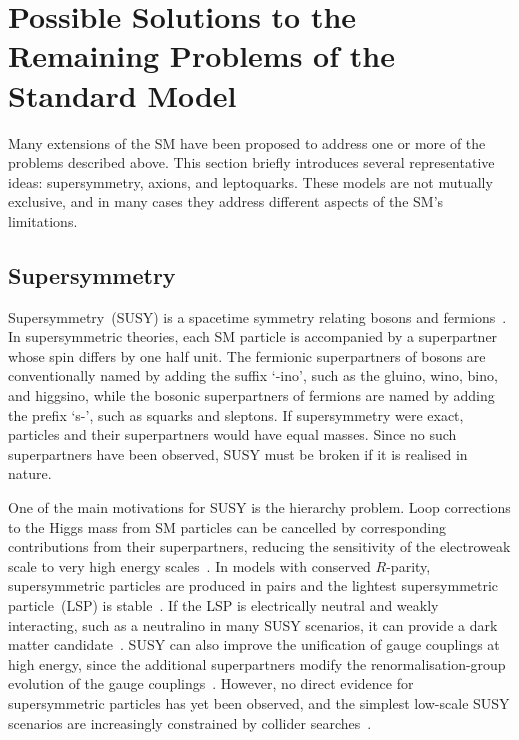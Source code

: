 \section{Possible Solutions to the Remaining Problems of the Standard Model}
\label{sec:bsm_solutions}

Many extensions of the SM have been proposed to address one or more of the problems described above. 
This section briefly introduces several representative ideas: supersymmetry, axions, and leptoquarks. 
These models are not mutually exclusive, and in many cases they address different aspects of the SM's limitations.

\subsection{Supersymmetry}
\label{subsec:susy}

Supersymmetry~(SUSY) is a spacetime symmetry relating bosons and fermions~\cite{WessZumino1974,MartinSUSYPrimer}.
In supersymmetric theories, each SM particle is accompanied by a superpartner whose spin differs by one half unit.
The fermionic superpartners of bosons are conventionally named by adding the suffix `-ino', such as the gluino, wino, bino, and higgsino, while the bosonic superpartners of fermions are named by adding the prefix `s-', such as squarks and sleptons.
If supersymmetry were exact, particles and their superpartners would have equal masses.
Since no such superpartners have been observed, SUSY must be broken if it is realised in nature.

One of the main motivations for SUSY is the hierarchy problem.
Loop corrections to the Higgs mass from SM particles can be cancelled by corresponding contributions from their superpartners, reducing the sensitivity of the electroweak scale to very high energy scales~\cite{DimopoulosGeorgi1981}.
In models with conserved $R$-parity, supersymmetric particles are produced in pairs and the lightest supersymmetric particle~(LSP) is stable~\cite{FarrarFayet1978}.
If the LSP is electrically neutral and weakly interacting, such as a neutralino in many SUSY scenarios, it can provide a dark matter candidate~\cite{Goldberg1983,EllisOliveSantosoSpanos1984}.
SUSY can also improve the unification of gauge couplings at high energy, since the additional superpartners modify the renormalisation-group evolution of the gauge couplings~\cite{DimopoulosRabyWilczek1981,Amaldi1991}.
However, no direct evidence for supersymmetric particles has yet been observed, and the simplest low-scale SUSY scenarios are increasingly constrained by collider searches~\cite{ATLAS2024SUSYSummary}.

